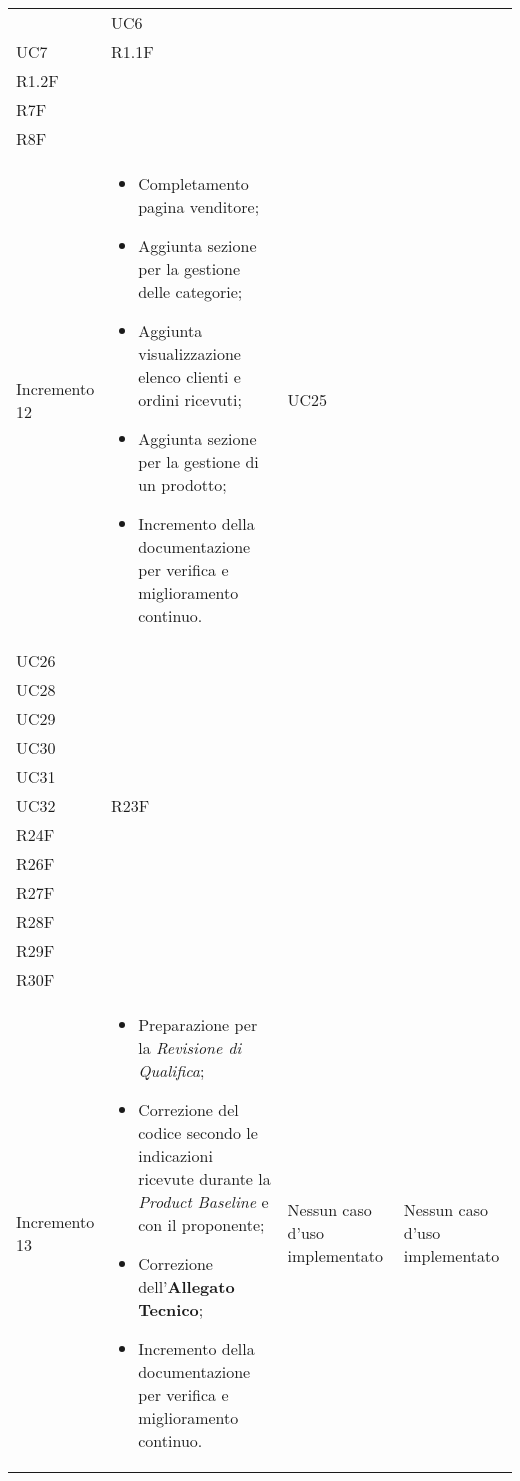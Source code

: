 \begin{longtable}{
    >{\centering}p{}
    >{\raggedright}p{}
    >{\centering}p{}
    >{\centering}p{}
    }
\begin{itemize}
    \end{itemize}    & UC6                                                                                            \\ UC7 & R1.1F \\ R1.2F \\ R7F \\ R8F
    \tabularnewline
    Incremento 12                 & \vspace{-15px}
    \begin{itemize}
        \renewcommand\labelitemi{-}
        \item Completamento pagina venditore;
        \item Aggiunta sezione per la gestione delle categorie;
        \item Aggiunta visualizzazione elenco clienti e ordini ricevuti;
        \item Aggiunta sezione per la gestione di un prodotto;
        \item Incremento della documentazione per verifica e miglioramento continuo.
    \end{itemize}    & UC25                                                                                           \\ UC26 \\ UC28 \\ UC29 \\ UC30 \\ UC31 \\ UC32 & R23F \\ R24F \\ R26F \\ R27F \\ R28F \\ R29F \\ R30F
    \tabularnewline
    Incremento 13                 &
    \vspace{-15px}
    \begin{itemize}
        \renewcommand\labelitemi{-}
        \item Preparazione per la \textit{Revisione di Qualifica};
        \item Correzione del codice secondo le indicazioni ricevute durante la \textit{Product Baseline} e con il proponente;
        \item Correzione dell'\textbf{Allegato Tecnico};
        \item Incremento della documentazione per verifica e miglioramento continuo.
    \end{itemize}    & Nessun caso d'uso implementato & Nessun caso d'uso implementato
    \tabularnewline
\end{longtable}
\renewcommand{\arraystretch}{1}
